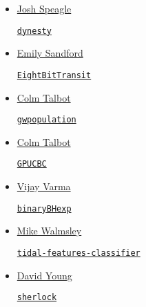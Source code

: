 \documentclass[11pt,a4paper]{article}
\begin{document}
\begin{itemize}
\item \href{https://github.com/joshspeagle}{Josh Speagle}
  \begin{itemize}
    \href{https://github.com/joshspeagle/dynesty}{\tt dynesty}
  \end{itemize}

\item \href{https://github.com/esandford}{Emily Sandford}
  \begin{itemize}
    \href{https://github.com/esandford/EightBitTransit}{\tt EightBitTransit}
  \end{itemize}

\item \href{https://github.com/ColmTalbot}{Colm Talbot}
  \begin{itemize}
    \href{https://github.com/ColmTalbot/gwpopulation}{\tt gwpopulation}
  \end{itemize}

\item \href{https://github.com/ColmTalbot}{Colm Talbot}
  \begin{itemize}
    \href{https://github.com/ColmTalbot/GPUCBC}{\tt GPUCBC}
  \end{itemize}


\item \href{https://github.com/vijayvarma392}{Vijay Varma}
  \begin{itemize}
    \href{https://github.com/vijayvarma392/binaryBHexp}{\tt binaryBHexp}
  \end{itemize}

\item \href{https://github.com/mwalmsley/}{Mike Walmsley} 
  \begin{itemize}
    \href{https://github.com/mwalmsley/tidal-features-classifier}{\tt tidal-features-classifier} 
\end{itemize}

\item \href{https://github.com/thespacedoctor}{David Young}
  \begin{itemize}
    \href{https://github.com/thespacedoctor/sherlock}{{\tt sherlock}}
  \end{itemize}







\end{itemize}
\end{document}
